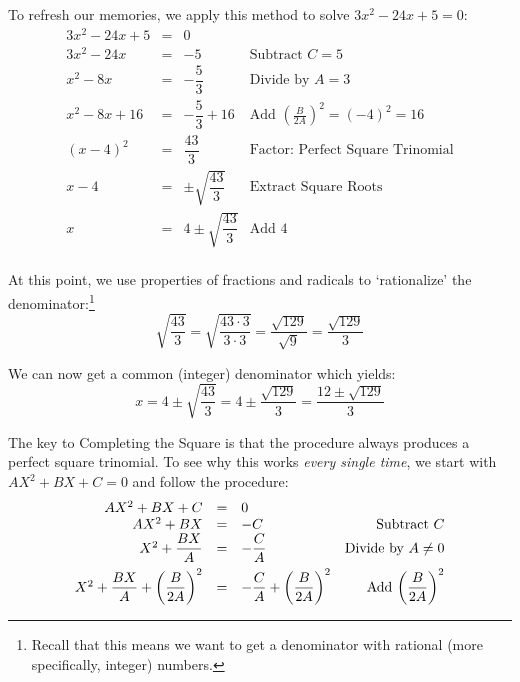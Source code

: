 \documentclass[11pt]{article}
\theoremstyle{definition}  %
\begin{document}
\medskip

To refresh our memories, we apply this method to solve $3x^2 - 24x + 5 = 0$: \[ \begin{array}{rclr}

3x^2 - 24x + 5 & = & 0 & \\

3x^2 - 24x  & = & -5 & \text{Subtract  $C=5$} \\

x^2 - 8x & = & -\dfrac{5}{3} & \text{Divide by $A = 3$} \\ [8pt]

x^2 - 8x + 16 & = & -\dfrac{5}{3} + 16 & \text{Add $\left(\frac{B}{2A}\right)^2 = (-4)^2 = 16$} \\ [8pt]

(x - 4)^2 & = & \dfrac{43}{3} & \text{Factor: Perfect Square Trinomial} \\
x - 4 & = & \pm \sqrt{\dfrac{43}{3}} & \text{Extract Square Roots} \\ [5pt]

x & = & 4 \pm \sqrt{\dfrac{43}{3}} & \text{Add $4$} \\

\end{array}\]

At this point, we use properties of fractions and radicals to `rationalize' the denominator:\footnote{Recall that this means we want to get a denominator with rational (more specifically, integer) numbers.}  \[ \sqrt{\dfrac{43}{3}} = \sqrt{\dfrac{43 \cdot 3}{3 \cdot 3}} = \dfrac{\sqrt{129}}{\sqrt{9}} = \dfrac{\sqrt{129}}{3} \]

We can now get a common (integer) denominator which yields: \[x=  4 \pm \sqrt{\dfrac{43}{3}} = 4 \pm \dfrac{\sqrt{129}}{3} = \dfrac{12 \pm \sqrt{129}}{3} \]

The key to Completing the Square is that the procedure always produces a perfect square trinomial. To see why this works \textit{every single time}, we start with $AX^2 + BX + C = 0$ and follow the procedure:\[ \begin{array}{rclr}

AX^2 + BX + C & = & 0 & \\

AX^2 + BX & = & -C & \text{Subtract $C$} \\

X^2 + \dfrac{BX}{A} & = & -\dfrac{C}{A} & \text{Divide by $A \neq 0$} \\ [8pt]

X^2 + \dfrac{BX}{A} + \left(\dfrac{B}{2A}\right)^2 & = & -\dfrac{C}{A} + \left(\dfrac{B}{2A}\right)^2 & \text{Add $ \left(\dfrac{B}{2A}\right)^2$} \\

\end{array} \]
\end{document}
